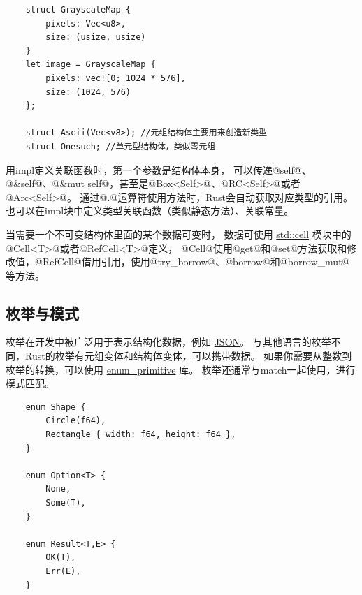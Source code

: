 \begin{code}[title=结构体定义和构造]
	\begin{verbatim}
    struct GrayscaleMap {
        pixels: Vec<u8>,
        size: (usize, usize)
    }
    let image = GrayscaleMap {
        pixels: vec![0; 1024 * 576],
        size: (1024, 576)
    };

    struct Ascii(Vec<v8>); //元组结构体主要用来创造新类型
    struct Onesuch; //单元型结构体，类似零元组
    \end{verbatim}
\end{code}

用impl定义关联函数时，第一个参数是结构体本身，
可以传递@self@、@&self@、@&mut self@，甚至是@Box<Self>@、@RC<Self>@或者@Arc<Self>@。
通过@.@运算符使用方法时，Rust会自动获取对应类型的引用。
也可以在impl块中定义类型关联函数（类似静态方法）、关联常量。

当需要一个不可变结构体里面的某个数据可变时，
数据可使用 \href{https://doc.rust-lang.org/std/cell}{std::cell} 模块中的@Cell<T>@或者@RefCell<T>@定义，
@Cell@使用@get@和@set@方法获取和修改值，@RefCell@借用引用，使用@try_borrow@、@borrow@和@borrow_mut@等方法。

\subsection{枚举与模式}
枚举在开发中被广泛用于表示结构化数据，例如 \href{https://docs.rs/serde_json}{JSON}。
与其他语言的枚举不同，Rust的枚举有元组变体和结构体变体，可以携带数据。
如果你需要从整数到枚举的转换，可以使用 \href{https://docs.rs/enum_primitive}{enum\_primitive} 库。
枚举还通常与match一起使用，进行模式匹配。

\begin{code}[title=枚举的定义]
	\begin{verbatim}
    enum Shape {
        Circle(f64),
        Rectangle { width: f64, height: f64 },
    }

    enum Option<T> {
        None,
        Some(T),
    }

    enum Result<T,E> {
        OK(T),
        Err(E),
    }
    \end{verbatim}
\end{code}

